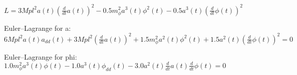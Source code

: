 
$L = 3 Mpl^{2} a{\left(t \right)} \left(\frac{d}{d t} a{\left(t \right)}\right)^{2} - 0.5 m_{\phi}^{2} a^{3}{\left(t \right)} \phi^{2}{\left(t \right)} - 0.5 a^{3}{\left(t \right)} \left(\frac{d}{d t} \phi{\left(t \right)}\right)^{2}$

Euler--Lagrange for a: $6 Mpl^{2} a{\left(t \right)} a_{dd}{\left(t \right)} + 3 Mpl^{2} \left(\frac{d}{d t} a{\left(t \right)}\right)^{2} + 1.5 m_{\phi}^{2} a^{2}{\left(t \right)} \phi^{2}{\left(t \right)} + 1.5 a^{2}{\left(t \right)} \left(\frac{d}{d t} \phi{\left(t \right)}\right)^{2} = 0$

Euler--Lagrange for phi: $1.0 m_{\phi}^{2} a^{3}{\left(t \right)} \phi{\left(t \right)} - 1.0 a^{3}{\left(t \right)} \phi_{dd}{\left(t \right)} - 3.0 a^{2}{\left(t \right)} \frac{d}{d t} a{\left(t \right)} \frac{d}{d t} \phi{\left(t \right)} = 0$
